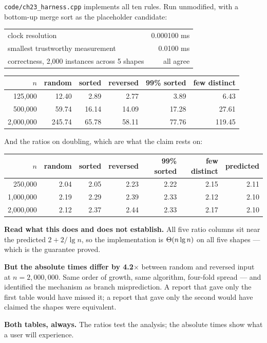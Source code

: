 \begin{worked}
\texttt{code/ch23\_harness.cpp} implements all ten rules. Run unmodified, with
a bottom-up merge sort as the placeholder candidate:

\begin{center}
\begin{tabular}{@{}lr@{}}
clock resolution & 0.000100 ms \\
smallest trustworthy measurement & 0.0100 ms \\
correctness, 2{,}000 instances across 5 shapes & all agree \\
\end{tabular}
\end{center}

\begin{center}
\begin{tabular}{@{}rrrrrr@{}}
\toprule
\rowcolor{primary!15}
$n$ & random & sorted & reversed & 99\% sorted & few distinct \\
\midrule
  125{,}000 &  12.40 &  2.89 &  2.77 &  3.89 &   6.43 \\
  500{,}000 &  59.74 & 16.14 & 14.09 & 17.28 &  27.61 \\
2{,}000{,}000 & 245.74 & 65.78 & 58.11 & 77.76 & 119.45 \\
\bottomrule
\end{tabular}
\end{center}

\smallskip
And the ratios on doubling, which are what the claim rests on:

\begin{center}
\begin{tabular}{@{}rrrrrrr@{}}
\toprule
\rowcolor{primary!15}
$n$ & random & sorted & reversed & 99\% sorted & few distinct & predicted \\
\midrule
  250{,}000 & 2.04 & 2.05 & 2.23 & 2.22 & 2.15 & 2.11 \\
1{,}000{,}000 & 2.19 & 2.29 & 2.39 & 2.33 & 2.12 & 2.10 \\
2{,}000{,}000 & 2.12 & 2.37 & 2.44 & 2.33 & 2.17 & 2.10 \\
\bottomrule
\end{tabular}
\end{center}

\smallskip
\textbf{Read what this does and does not establish.} All five ratio columns sit
near the predicted $2 + 2/\lg n$, so the implementation is $\Theta(n\operatorname{lg} n)$ on
all five shapes --- which is the guarantee  proved.

\smallskip
\textbf{But the absolute times differ by 4.2$\times$} between random and
reversed input at $n = 2{,}000{,}000$. Same order of growth, same algorithm,
four-fold spread --- and  identified the mechanism as branch
misprediction. A report that gave only the first table would have missed it; a
report that gave only the second would have claimed the shapes were equivalent.

\smallskip
\textbf{Both tables, always.} The ratios test the analysis; the absolute times
show what a user will experience.
\end{worked}

